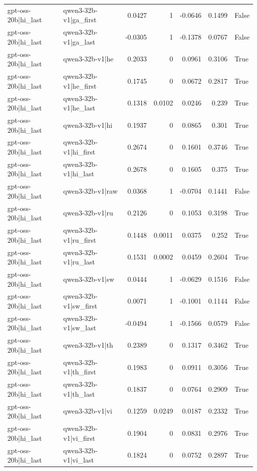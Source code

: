 \begin{table}
\begin{tabular}{l l r r r r l}
gpt-oss-20b|hi_last & qwen3-32b-v1|ga_first & 0.0427 & 1 & -0.0646 & 0.1499 & False \\
gpt-oss-20b|hi_last & qwen3-32b-v1|ga_last & -0.0305 & 1 & -0.1378 & 0.0767 & False \\
gpt-oss-20b|hi_last & qwen3-32b-v1|he & 0.2033 & 0 & 0.0961 & 0.3106 & True \\
gpt-oss-20b|hi_last & qwen3-32b-v1|he_first & 0.1745 & 0 & 0.0672 & 0.2817 & True \\
gpt-oss-20b|hi_last & qwen3-32b-v1|he_last & 0.1318 & 0.0102 & 0.0246 & 0.239 & True \\
gpt-oss-20b|hi_last & qwen3-32b-v1|hi & 0.1937 & 0 & 0.0865 & 0.301 & True \\
gpt-oss-20b|hi_last & qwen3-32b-v1|hi_first & 0.2674 & 0 & 0.1601 & 0.3746 & True \\
gpt-oss-20b|hi_last & qwen3-32b-v1|hi_last & 0.2678 & 0 & 0.1605 & 0.375 & True \\
gpt-oss-20b|hi_last & qwen3-32b-v1|raw & 0.0368 & 1 & -0.0704 & 0.1441 & False \\
gpt-oss-20b|hi_last & qwen3-32b-v1|ru & 0.2126 & 0 & 0.1053 & 0.3198 & True \\
gpt-oss-20b|hi_last & qwen3-32b-v1|ru_first & 0.1448 & 0.0011 & 0.0375 & 0.252 & True \\
gpt-oss-20b|hi_last & qwen3-32b-v1|ru_last & 0.1531 & 0.0002 & 0.0459 & 0.2604 & True \\
gpt-oss-20b|hi_last & qwen3-32b-v1|sw & 0.0444 & 1 & -0.0629 & 0.1516 & False \\
gpt-oss-20b|hi_last & qwen3-32b-v1|sw_first & 0.0071 & 1 & -0.1001 & 0.1144 & False \\
gpt-oss-20b|hi_last & qwen3-32b-v1|sw_last & -0.0494 & 1 & -0.1566 & 0.0579 & False \\
gpt-oss-20b|hi_last & qwen3-32b-v1|th & 0.2389 & 0 & 0.1317 & 0.3462 & True \\
gpt-oss-20b|hi_last & qwen3-32b-v1|th_first & 0.1983 & 0 & 0.0911 & 0.3056 & True \\
gpt-oss-20b|hi_last & qwen3-32b-v1|th_last & 0.1837 & 0 & 0.0764 & 0.2909 & True \\
gpt-oss-20b|hi_last & qwen3-32b-v1|vi & 0.1259 & 0.0249 & 0.0187 & 0.2332 & True \\
gpt-oss-20b|hi_last & qwen3-32b-v1|vi_first & 0.1904 & 0 & 0.0831 & 0.2976 & True \\
gpt-oss-20b|hi_last & qwen3-32b-v1|vi_last & 0.1824 & 0 & 0.0752 & 0.2897 & True \\

\end{tabular}
\end{table}
